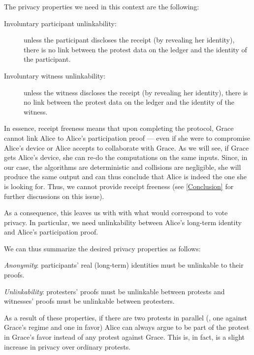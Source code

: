 The privacy properties we need in this context are the following:
\begin{description}
 \item[Involuntary participant unlinkability:]  unless the participant discloses the receipt 
   (by revealing her identity), there is no link between the protest data on 
   the ledger and the identity of the participant.

 \item[Involuntary witness unlinkability:]  unless the witness discloses the receipt (by revealing her 
   identity), there is no link between the protest data on the ledger and the 
   identity of the witness.
\end{description}
In essence, receipt freeness means that upon completing the protocol, Grace cannot link Alice to Alice's participation proof --- even if she were to compromise Alice's device or Alice accepts to collaborate with Grace.
As we will see, if Grace gets Alice's device, she can re-do the computations on the same inputs.
Since, in our case, the algorithms are deterministic and collisions are negligible, she will produce the same output and can thus conclude that Alice is indeed the one she is looking for.
Thus, we cannot provide receipt freeness (see \cref{Conclusion} for further discussions on this issue).

As a consequence, this leaves us with with what would correspond to vote privacy.
In particular, we need unlinkability between Alice's long-term identity and Alice's participation proof.


We can thus summarize the desired privacy properties as follows:
\begin{requirements}[P]
\item\label{ProofUnlink} \emph{Anonymity}: participants' real (long-term) 
  identities must be unlinkable to their proofs.
\item\label{ProtestUnlink} \emph{Unlinkability}: protesters' proofs must be 
  unlinkable between protests and witnesses' proofs must be unlinkable between 
  protesters.
\end{requirements}

As a result of these properties, if there are two protests in parallel (\eg, one against Grace's regime and one in favor) Alice can always argue to be part of the protest in Grace's favor instead of any protest against Grace.
This is, in fact, is a slight increase in privacy over ordinary protests.

